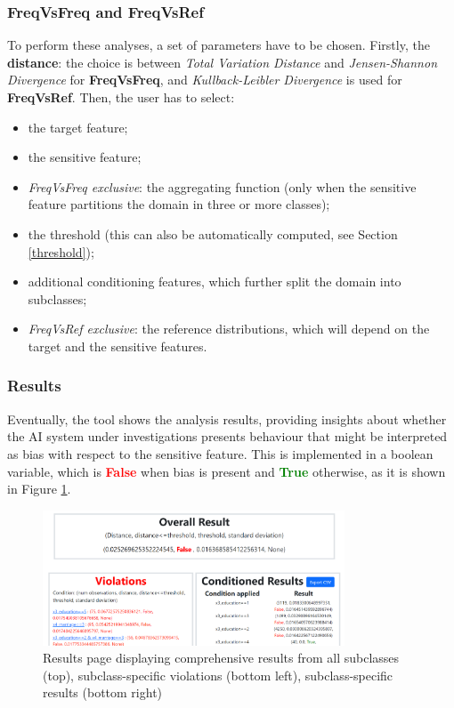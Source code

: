 \documentclass[
]{ceurart}
\begin{document}
\subsubsection{FreqVsFreq and FreqVsRef}
To perform these analyses, a set of parameters have to be chosen. Firstly, the \textbf{distance}: the choice is between \textit{Total Variation Distance} and \textit{Jensen-Shannon Divergence} for \textbf{FreqVsFreq}, and \textit{Kullback-Leibler Divergence} is used for \textbf{FreqVsRef}. Then, the user has to select: 

\begin{itemize}
  \item the target feature;
  \item the sensitive feature;
  \item \textit{FreqVsFreq exclusive}: the aggregating function (only when the sensitive feature partitions the domain in three or more classes);
  \item the threshold (this can also be automatically computed, see Section \ref{threshold});
  \item additional conditioning features, which further split the domain into subclasses;
  \item \textit{FreqVsRef exclusive}: the reference distributions, which will depend on the target and the sensitive features. 
\end{itemize}

\subsubsection{Results}
Eventually, the tool shows the analysis results, providing insights about whether the AI system under investigations presents behaviour that might be interpreted as bias with respect to the sensitive feature. This is implemented in a boolean variable, which is \textbf{\textcolor{red}{False}} when bias is present and \textbf{\textcolor{green}{True}} otherwise, as it is shown in Figure \ref{fig:results}.

\begin{figure}[h]
  \begin{center}
    \includegraphics[width=0.8\textwidth]{frontend_results_page.png}
  \end{center}
  \caption{Results page displaying comprehensive results from all subclasses (top), subclass-specific violations (bottom left), subclass-specific results (bottom right)}
  \label{fig:results}
\end{figure}
\end{document}
